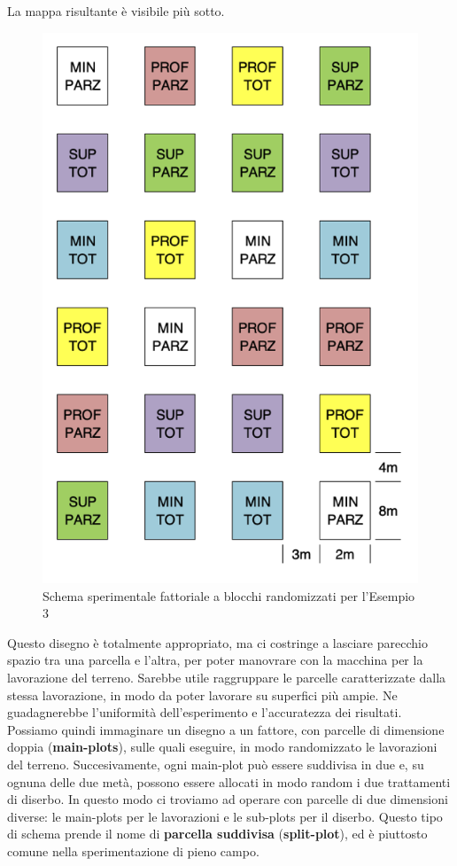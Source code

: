 \documentclass[a4paper,12pt,oneside]{book}
\theoremstyle{definition}
\theoremstyle{definition}
\theoremstyle{definition}
\theoremstyle{remark}
\begin{document}
La mappa risultante è visibile più sotto.

\begin{figure}

{\centering \includegraphics[width=0.65\linewidth]{_images/Mappa3FATT} 

}

\caption{Schema sperimentale fattoriale a blocchi randomizzati per l'Esempio 3}\label{fig:figName36}
\end{figure}

Questo disegno è totalmente appropriato, ma ci costringe a lasciare
parecchio spazio tra una parcella e l'altra, per poter manovrare con la
macchina per la lavorazione del terreno. Sarebbe utile raggruppare le
parcelle caratterizzate dalla stessa lavorazione, in modo da poter
lavorare su superfici più ampie. Ne guadagnerebbe l'uniformità
dell'esperimento e l'accuratezza dei risultati. Possiamo quindi
immaginare un disegno a un fattore, con parcelle di dimensione doppia
(\textbf{main-plots}), sulle quali eseguire, in modo randomizzato le
lavorazioni del terreno. Succesivamente, ogni main-plot può essere
suddivisa in due e, su ognuna delle due metà, possono essere allocati in
modo random i due trattamenti di diserbo. In questo modo ci troviamo ad
operare con parcelle di due dimensioni diverse: le main-plots per le
lavorazioni e le sub-plots per il diserbo. Questo tipo di schema prende
il nome di \textbf{parcella suddivisa} (\textbf{split-plot}), ed è
piuttosto comune nella sperimentazione di pieno campo.
\end{document}
